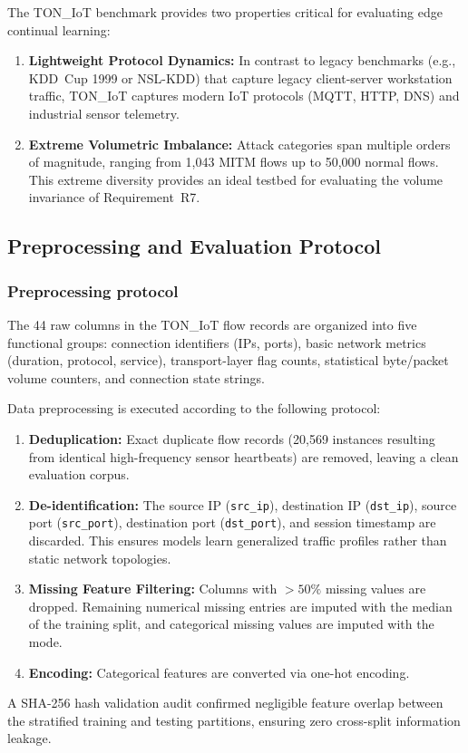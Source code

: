The TON\_IoT benchmark provides two properties critical for evaluating edge continual learning:
\begin{enumerate}
    \item \textbf{Lightweight Protocol Dynamics:} In contrast to legacy benchmarks (e.g., KDD~Cup 1999 or NSL-KDD) that capture legacy client-server workstation traffic, TON\_IoT captures modern IoT protocols (MQTT, HTTP, DNS) and industrial sensor telemetry.
    \item \textbf{Extreme Volumetric Imbalance:} Attack categories span multiple orders of magnitude, ranging from 1{,}043 MITM flows up to 50{,}000 normal flows. This extreme diversity provides an ideal testbed for evaluating the volume invariance of Requirement~R7.
\end{enumerate}

\subsection{Preprocessing and Evaluation Protocol}
\label{subsec:preprocessing_protocol}

\subsubsection{Preprocessing protocol}
The 44 raw columns in the TON\_IoT flow records are organized into five functional groups: connection identifiers (IPs, ports), basic network metrics (duration, protocol, service), transport-layer flag counts, statistical byte/packet volume counters, and connection state strings.

Data preprocessing is executed according to the following protocol:
\begin{enumerate}
    \item \textbf{Deduplication:} Exact duplicate flow records (20{,}569 instances resulting from identical high-frequency sensor heartbeats) are removed, leaving a clean evaluation corpus.
    \item \textbf{De-identification:} The source IP (\texttt{src\_ip}), destination IP (\texttt{dst\_ip}), source port (\texttt{src\_port}), destination port (\texttt{dst\_port}), and session timestamp are discarded. This ensures models learn generalized traffic profiles rather than static network topologies.
    \item \textbf{Missing Feature Filtering:} Columns with $> 50\%$ missing values are dropped. Remaining numerical missing entries are imputed with the median of the training split, and categorical missing values are imputed with the mode.
    \item \textbf{Encoding:} Categorical features are converted via one-hot encoding.
\end{enumerate}
A SHA-256 hash validation audit confirmed negligible feature overlap between the stratified training and testing partitions, ensuring zero cross-split information leakage.


